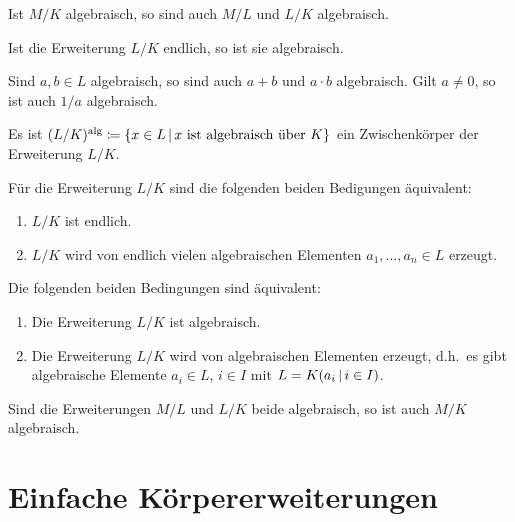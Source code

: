 \begin{example}
  Ist $M/K$ algebraisch, so sind auch $M/L$ und $L/K$ algebraisch.
\end{example}

\begin{lemma}
  Ist die Erweiterung $L/K$ endlich, so ist sie algebraisch.
\end{lemma}

\begin{corollary}
  Sind $a, b \in L$ algebraisch, so sind auch $a + b$ und $a \cdot b$ algebraisch.
  Gilt $a \neq 0$, so ist auch $1/a$ algebraisch.
\end{corollary}

\begin{corollary}
  Es ist $(L/K)^\alg \defined \{ x \in L \suchthat \text{$x$ ist algebraisch über $K$} \}$ ein Zwischenkörper der Erweiterung $L/K$.
\end{corollary}

\begin{corollary}
  Für die Erweiterung $L/K$ sind die folgenden beiden Bedigungen äquivalent:
  \begin{enumerate}
    \item
      $L/K$ ist endlich.
    \item
      $L/K$ wird von endlich vielen algebraischen Elementen $a_1, \dotsc, a_n \in L$ erzeugt.
  \end{enumerate}
\end{corollary}

\begin{corollary}
  Die folgenden beiden Bedingungen sind äquivalent:
  \begin{enumerate}
    \item
      Die Erweiterung $L/K$ ist algebraisch.
    \item
      Die Erweiterung $L/K$ wird von algebraischen Elementen erzeugt, d.h.\ es gibt algebraische Elemente $a_i \in L$, $i \in I$ mit $L = K(a_i \suchthat i \in I)$.
  \end{enumerate}
\end{corollary}

\begin{corollary}
  Sind die Erweiterungen $M/L$ und $L/K$ beide algebraisch, so ist auch $M/K$ algebraisch.
\end{corollary}





\section{Einfache Körpererweiterungen}

